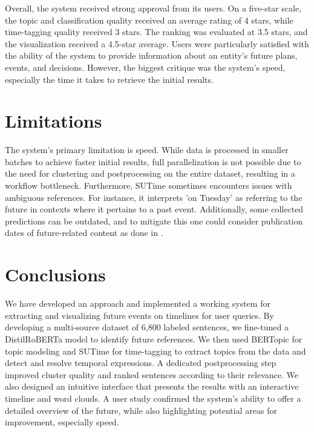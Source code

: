 \documentclass[sigconf]{acmart}
\begin{document}
Overall, the system received strong approval from its users. On a five-star scale, the topic and classification quality received an average rating of 4 stars, while time-tagging quality received 3 stars. The ranking was evaluated at 3.5 stars, and the visualization received a 4.5-star average. Users were particularly satisfied with the ability of the system to provide information about an entity's future plans, events, and decisions. However, the biggest critique was the system's speed, especially the time it takes to retrieve the initial results. 

\section{Limitations}
The system's primary limitation is speed. While data is processed in smaller batches to achieve faster initial results, full parallelization is not possible due to the need for clustering and postprocessing on the entire dataset, resulting in a workflow bottleneck. 
Furthermore, SUTime sometimes encounters issues with ambiguous references. For instance, it interprets 'on Tuesday' as referring to the future in contexts where it pertains to a past event. 
Additionally, some collected predictions can be outdated, and to mitigate this one could consider publication dates of future-related content as done in \cite{yusuke}. 



\section{Conclusions}
We have developed an approach and implemented a working system for extracting and visualizing future events on timelines for user queries. By developing a multi-source dataset of 6,800 labeled sentences, we fine-tuned a DistilRoBERTa model to identify future references.  We then used BERTopic for topic modeling and SUTime for time-tagging to extract topics from the data and detect and resolve temporal expressions. A dedicated postprocessing step improved cluster quality and ranked sentences according to their relevance. We also designed an intuitive interface that presents the results with an interactive timeline and word clouds. A user study confirmed the system's ability to offer a detailed overview of the future, while also highlighting potential areas for improvement, especially speed.





\end{document}
